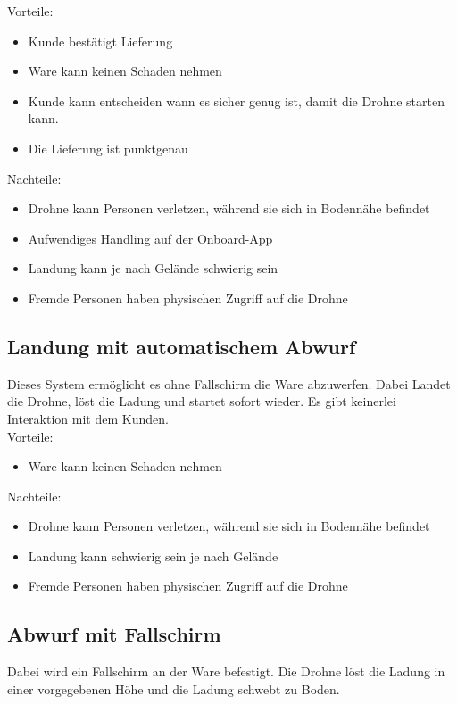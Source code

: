 Vorteile:
\begin{itemize}
	\item Kunde bestätigt Lieferung
	\item Ware kann keinen Schaden nehmen
	\item Kunde kann entscheiden wann es sicher genug ist, damit die Drohne starten kann.
	\item Die Lieferung ist punktgenau
\end{itemize}


Nachteile:
\begin{itemize}
	\item Drohne kann Personen verletzen, während sie sich in Bodennähe befindet
	\item Aufwendiges Handling auf der Onboard-App
	\item Landung kann je nach Gelände schwierig sein
	\item Fremde Personen haben physischen Zugriff auf die Drohne
\end{itemize}

\subsection{Landung mit automatischem Abwurf}

Dieses System ermöglicht es ohne Fallschirm die Ware abzuwerfen. Dabei Landet die Drohne, löst die Ladung und startet sofort wieder. Es gibt keinerlei Interaktion mit dem Kunden.\\

Vorteile:
\begin{itemize}
	\item Ware kann keinen Schaden nehmen
\end{itemize}


Nachteile:
\begin{itemize}
	\item Drohne kann Personen verletzen, während sie sich in Bodennähe befindet
	\item Landung kann schwierig sein je nach Gelände
	\item Fremde Personen haben physischen Zugriff auf die Drohne
\end{itemize}


\subsection{Abwurf mit Fallschirm}

Dabei wird ein Fallschirm an der Ware befestigt. Die Drohne löst die Ladung in einer vorgegebenen Höhe und die Ladung schwebt zu Boden.\\

